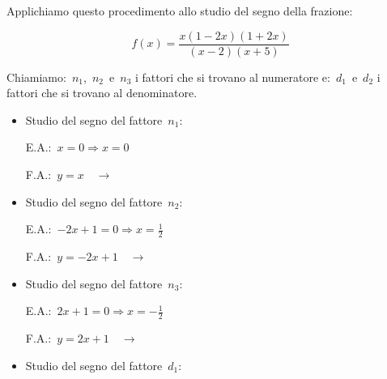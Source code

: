  \begin{esempio}
Applichiamo questo procedimento allo studio del segno della frazione:

\[f(x)=\frac{x(1 -2 x)(1 + 2 x)}{(x -2)(x +5)}\]

Chiamiamo:~\(n_1\),~\(n_2\)~e~\(n_3\) i fattori che si trovano al numeratore 
e:~\(d_1\)~e~\(d_2\) i fattori che si trovano al denominatore.

\begin{itemize} [noitemsep]
 \item Studio del segno del fattore~\(n_1\):\\
 \begin{minipage}{.45\textwidth}
  E.A.:~\(x=0 \Rightarrow x=0\)
 \end{minipage}
 \begin{minipage}{.25\textwidth}
  F.A.:~\(y = x \quad \rightarrow\)
 \end{minipage}
 \begin{minipage}{.3\textwidth}
%   
 \end{minipage}
 \item Studio del segno del fattore~\(n_2\):\\
 \begin{minipage}{.45\textwidth}
  E.A.:~\(-2 x +1=0 \Rightarrow x=\frac{1}{2}\)
 \end{minipage}
 \begin{minipage}{.25\textwidth}
  F.A.:~\(y = -2 x +1 \quad \rightarrow\)
 \end{minipage}
 \begin{minipage}{.3\textwidth}
%   
 \end{minipage}
 \item Studio del segno del fattore~\(n_3\):\\
 \begin{minipage}{.45\textwidth}
  E.A.:~\(2 x +1=0 \Rightarrow x=- \frac{1}{2}\)
 \end{minipage}
 \begin{minipage}{.25\textwidth}
  F.A.:~\(y=2 x +1 \quad \rightarrow\)
 \end{minipage}
 \begin{minipage}{.3\textwidth}
%   
 \end{minipage}
 \item Studio del segno del fattore~\(d_1\):\\

\end{itemize}
\end{esempio}
